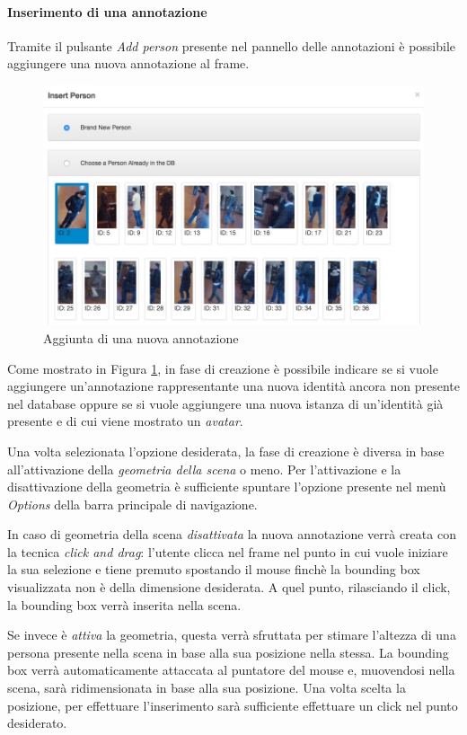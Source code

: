 \paragraph{Inserimento di una annotazione}

Tramite il pulsante \emph{Add person} presente nel pannello delle annotazioni è possibile aggiungere una nuova annotazione al frame. 

\begin{figure}[h]
\centering
\includegraphics[width=0.8\linewidth]{images/add-person.jpg}
  \caption{Aggiunta di una nuova annotazione}
  \label{fig:addperson}
\end{figure}

Come mostrato in Figura \ref{fig:addperson}, in fase di creazione è possibile indicare se si vuole aggiungere un'annotazione rappresentante una nuova identità ancora non presente nel database oppure se si vuole aggiungere una nuova istanza di un'identità già presente e di cui viene mostrato un \emph{avatar}.

Una volta selezionata l'opzione desiderata, la fase di creazione è diversa in base all'attivazione della \emph{geometria della scena} o meno. Per l'attivazione e la disattivazione della geometria è sufficiente spuntare l'opzione presente nel menù \emph{Options} della barra principale di navigazione.

In caso di geometria della scena \emph{disattivata} la nuova annotazione verrà creata con la tecnica \emph{click and drag}: l'utente clicca nel frame nel punto in cui vuole iniziare la sua selezione e tiene premuto spostando il mouse finchè la bounding box visualizzata non è della dimensione desiderata. A quel punto, rilasciando il click, la bounding box verrà inserita nella scena.

Se invece è \emph{attiva} la geometria, questa verrà sfruttata per stimare l'altezza di una persona presente nella scena in base alla sua posizione nella stessa. La bounding box verrà automaticamente attaccata al puntatore del mouse e, muovendosi nella scena, sarà ridimensionata in base alla sua posizione. Una volta scelta la posizione, per effettuare l'inserimento sarà sufficiente effettuare un click nel punto desiderato. 

